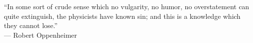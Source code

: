 
“In some sort of crude sense which no vulgarity, no humor, no overstatement can quite extinguish, the physicists have known sin; and this is a knowledge which they cannot lose.” \\
\footnotesize
--- Robert Oppenheimer

